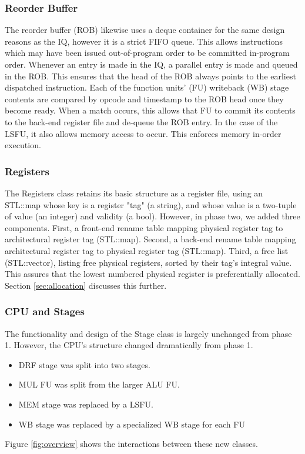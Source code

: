 \documentclass[12pt]{article}
\begin{document}
\subsubsection{Reorder Buffer}
\label{sec:rob}
The reorder buffer (ROB) likewise uses a deque container for the same design reasons as the IQ, however it is a strict FIFO queue. 
This allows instructions which may have been issued out-of-program order to be committed in-program order. 
Whenever an entry is made in the IQ, a parallel entry is made and queued in the ROB. 
This ensures that the head of the ROB always points to the earliest dispatched instruction. 
Each of the function units' (FU) writeback (WB) stage contents are compared by opcode and timestamp to the ROB head once they become ready. 
When a match occurs, this allows that FU to commit its contents to the back-end register file and de-queue the ROB entry. 
In the case of the LSFU, it also allows memory access to occur.
This enforces memory in-order execution.

\subsubsection{Registers}
The Registers class retains its basic structure as a register file, using an STL::map whose key is a register "tag" (a string), and whose value is a two-tuple of value (an integer) and validity (a bool).
However, in phase two, we added three components.
First, a front-end rename table mapping physical register tag to architectural register tag (STL::map).
Second, a back-end rename table mapping architectural register tag to physical register tag (STL::map).
Third, a free list (STL::vector), listing free physical registers, sorted by their tag's integral value.
This assures that the lowest numbered physical register is preferentially allocated. Section \ref{sec:allocation} discusses this further.

\subsubsection{CPU and Stages}
The functionality and design of the Stage class is largely unchanged from phase 1. 
However, the CPU's structure changed dramatically from phase 1.
\begin{itemize}
  \item DRF stage was split into two stages.
  \item MUL FU was split from the larger ALU FU.
  \item MEM stage was replaced by a LSFU.
  \item WB stage was replaced by a specialized WB stage for each FU
\end{itemize}
Figure \ref{fig:overview} shows the interactions between these new classes.
\end{document}
